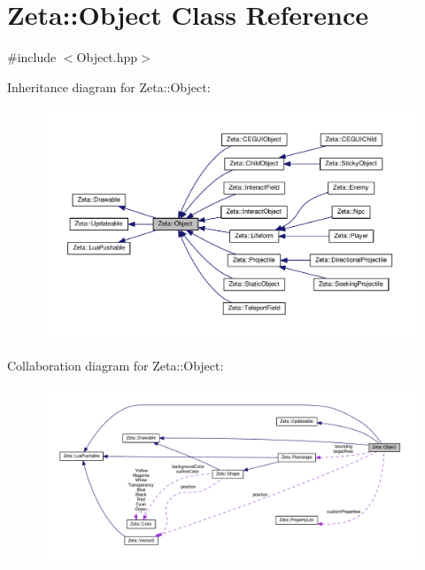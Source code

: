 \hypertarget{classZeta_1_1Object}{\section{Zeta\+:\+:Object Class Reference}
\label{classZeta_1_1Object}
}


{\ttfamily \#include $<$Object.\+hpp$>$}



Inheritance diagram for Zeta\+:\+:Object\+:\nopagebreak
\begin{figure}[H]
\begin{center}
\leavevmode
\includegraphics[width=350pt]{classZeta_1_1Object__inherit__graph}
\end{center}
\end{figure}


Collaboration diagram for Zeta\+:\+:Object\+:\nopagebreak
\begin{figure}[H]
\begin{center}
\leavevmode
\includegraphics[width=350pt]{classZeta_1_1Object__coll__graph}
\end{center}
\end{figure}
